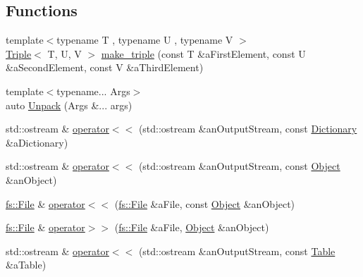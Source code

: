 \subsection*{Functions}
\begin{DoxyCompactItemize}
\item 
{\footnotesize template$<$typename T , typename U , typename V $>$ }\\\mbox{\hyperlink{structlibrary_1_1core_1_1ctnr_1_1_triple}{Triple}}$<$ T, U, V $>$ \mbox{\hyperlink{namespacelibrary_1_1core_1_1ctnr_a96a0b941c0de59772cb5e073d0c2b8a8}{make\+\_\+triple}} (const T \&a\+First\+Element, const U \&a\+Second\+Element, const V \&a\+Third\+Element)
\item 
{\footnotesize template$<$typename... Args$>$ }\\auto \mbox{\hyperlink{namespacelibrary_1_1core_1_1ctnr_aa83e692c1420d325c7602ae7b21d626d}{Unpack}} (Args \&... args)
\item 
std\+::ostream \& \mbox{\hyperlink{namespacelibrary_1_1core_1_1ctnr_a5089e336819bf6e43bdb9ea9c8c01fcf}{operator$<$$<$}} (std\+::ostream \&an\+Output\+Stream, const \mbox{\hyperlink{classlibrary_1_1core_1_1ctnr_1_1_dictionary}{Dictionary}} \&a\+Dictionary)
\item 
std\+::ostream \& \mbox{\hyperlink{namespacelibrary_1_1core_1_1ctnr_a20ee48a4a564834bae30af868b549043}{operator$<$$<$}} (std\+::ostream \&an\+Output\+Stream, const \mbox{\hyperlink{classlibrary_1_1core_1_1ctnr_1_1_object}{Object}} \&an\+Object)
\item 
\mbox{\hyperlink{classlibrary_1_1core_1_1fs_1_1_file}{fs\+::\+File}} \& \mbox{\hyperlink{namespacelibrary_1_1core_1_1ctnr_af1692b068183ff60da620deb994a8b59}{operator$<$$<$}} (\mbox{\hyperlink{classlibrary_1_1core_1_1fs_1_1_file}{fs\+::\+File}} \&a\+File, const \mbox{\hyperlink{classlibrary_1_1core_1_1ctnr_1_1_object}{Object}} \&an\+Object)
\item 
\mbox{\hyperlink{classlibrary_1_1core_1_1fs_1_1_file}{fs\+::\+File}} \& \mbox{\hyperlink{namespacelibrary_1_1core_1_1ctnr_a0a7da2e178e3ef26afa29284deb8de0f}{operator$>$$>$}} (\mbox{\hyperlink{classlibrary_1_1core_1_1fs_1_1_file}{fs\+::\+File}} \&a\+File, \mbox{\hyperlink{classlibrary_1_1core_1_1ctnr_1_1_object}{Object}} \&an\+Object)
\item 
std\+::ostream \& \mbox{\hyperlink{namespacelibrary_1_1core_1_1ctnr_aae8e4f8665fde7fdd3e3f479e48c90aa}{operator$<$$<$}} (std\+::ostream \&an\+Output\+Stream, const \mbox{\hyperlink{classlibrary_1_1core_1_1ctnr_1_1_table}{Table}} \&a\+Table)
\end{DoxyCompactItemize}


